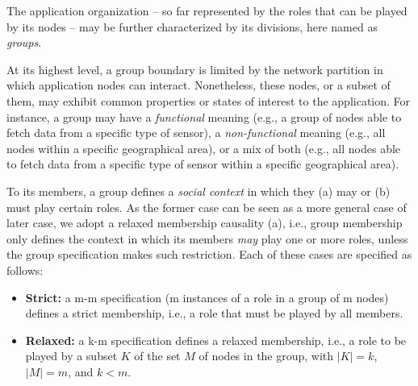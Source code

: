 






The application organization -- so far represented by the roles that can be played by its nodes -- may be further characterized by its divisions, here named as \textit{groups}. 

At its highest level, a group boundary is limited by the network partition in which application nodes can interact. Nonetheless, these nodes, or a subset of them, may exhibit common properties or states of interest to the application. For instance, a group may have a \textit{functional} meaning (e.g., a group of nodes able to fetch data from a specific type of sensor), a \textit{non-functional} meaning (e.g., all nodes within a specific geographical area), or a mix of both (e.g., all nodes able to fetch data from a specific type of sensor within a specific geographical area). 


To its members, a group defines a \textit{social context} in which they (a) may or (b) must play certain roles. As the former case can be seen as a more general case of later case, we adopt a relaxed membership causality (a), i.e., group membership only defines the context in which its members \textit{may} play one or more roles, unless the group specification makes such restriction. Each of these cases are specified as follows:

\begin{itemize}
	
	\item \textbf{Strict:} a m-m specification (m instances of a role in a group of m nodes) defines a strict membership, i.e., a role that must be played by all members.
	
	\item \textbf{Relaxed:} a k-m specification defines a relaxed membership, i.e., a role to be played by a subset $K$ of the set $M$ of nodes in the group, with $|K| = k$, $|M| = m$, and $k < m$.
	
\end{itemize}

